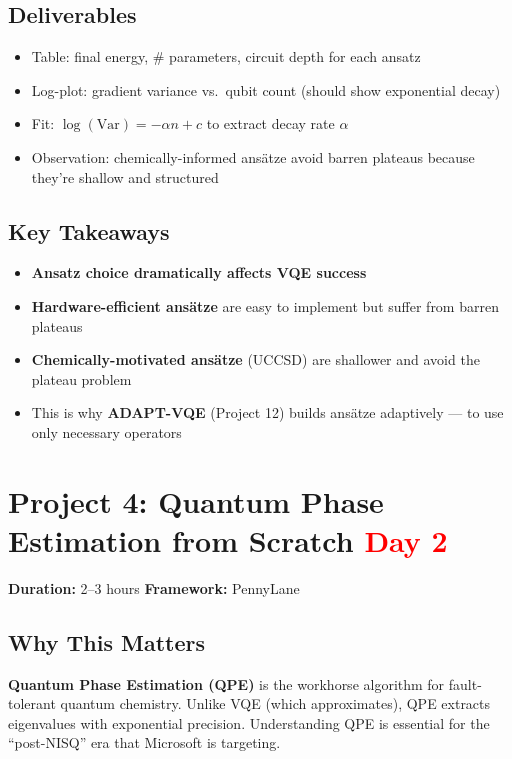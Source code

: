 \documentclass[11pt,a4paper]{article}
\begin{document}
\subsection*{Deliverables}
\begin{itemize}
    \item[\checkmark] Table: final energy, \# parameters, circuit depth for each ansatz
    \item[\checkmark] Log-plot: gradient variance vs.\ qubit count (should show exponential decay)
    \item[\checkmark] Fit: $\log(\text{Var}) = -\alpha n + c$ to extract decay rate $\alpha$
    \item[\checkmark] Observation: chemically-informed ansätze avoid barren plateaus because they're shallow and structured
\end{itemize}

\subsection*{Key Takeaways}
\begin{itemize}
    \item \textbf{Ansatz choice dramatically affects VQE success}
    \item \textbf{Hardware-efficient ansätze} are easy to implement but suffer from barren plateaus
    \item \textbf{Chemically-motivated ansätze} (UCCSD) are shallower and avoid the plateau problem
    \item This is why \textbf{ADAPT-VQE} (Project 12) builds ansätze adaptively --- to use only necessary operators
\end{itemize}


\section{Project 4: Quantum Phase Estimation from Scratch \hfill \textcolor{red}{\textbf{Day 2}}}

\begin{questionbox}
\textbf{Duration:} 2--3 hours \quad \textbf{Framework:} PennyLane
\end{questionbox}

\subsection*{Why This Matters}
\textbf{Quantum Phase Estimation (QPE)} is the workhorse algorithm for fault-tolerant quantum chemistry. Unlike VQE (which approximates), QPE extracts eigenvalues with exponential precision. Understanding QPE is essential for the ``post-NISQ'' era that Microsoft is targeting.
\end{document}
